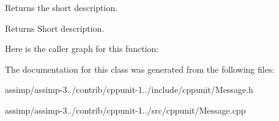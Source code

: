 Returns the short description. 

\begin{DoxyReturn}{Returns}
Short description. 
\end{DoxyReturn}


Here is the caller graph for this function\+:




The documentation for this class was generated from the following files\+:\begin{DoxyCompactItemize}
\item 
assimp/assimp-\/3../contrib/cppunit-\/1../include/cppunit/Message.\+h\item 
assimp/assimp-\/3../contrib/cppunit-\/1../src/cppunit/Message.\+cpp\end{DoxyCompactItemize}
